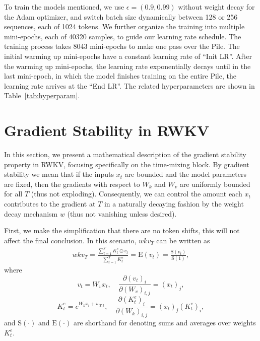 \documentclass[11pt]{article}
\begin{document}
To train the models mentioned, we use $\epsilon=(0.9,0.99)$ without weight decay for the Adam optimizer, and switch batch size dynamically between 128 or 256 sequences, each of 1024 tokens.
We further organize the training into multiple mini-epochs, each of 40320 samples, to guide our learning rate schedule.
The training process takes 8043 mini-epochs to make one pass over the Pile.
The initial warming up mini-epochs have a constant learning rate of ``Init LR''.
After the warming up mini-epochs, the learning rate exponentially decays until in the last mini-epoch, in which the model finishes training on the entire Pile, the learning rate arrives at the ``End LR''.
The related hyperparameters are shown in Table~\ref{tab:hyperparam}.

\section{Gradient Stability in RWKV} 
\label{sec:appendix-gradstab}

In this section, we present a mathematical description of the gradient stability property in RWKV, focusing specifically on the time-mixing block. By gradient stability we mean that if the inputs $x_t$ are bounded and the model parameters are fixed, then the gradients with respect to $W_k$ and $W_v$ are uniformly bounded for all $T$ (thus not exploding). Consequently, we can control the amount each $x_t$ contributes to the gradient at $T$ in a naturally decaying fashion by the weight decay mechanism $w$ (thus not vanishing unless desired).

First, we make the simplification that there are no token shifts, this will not affect the final conclusion. In this scenario, $wkv_T$ can be written as
\begin{align} wkv_T = \frac{\sum _{t=1}^T K^e_t \odot v_t} {\sum _{t=1}^T K^e_t} = \mathrm{E} (v_t) = \frac{\mathrm{S}(v_t)}{\mathrm{S}(1)},
\end{align}
where
$$ v_t = W_v x_t, \quad\frac{\partial (v_t)_i}{\partial(W_v)_{i,j}} = (x_t)_j, $$
$$ K^e_t = e^{W_k x_t+w_{T,t}}, \quad\frac{\partial (K^e_t)_i}{\partial (W_k)_{i,j}} = (x_t)_j (K^e_t)_i, $$
and $\mathrm{S}(\cdot)$ and $\mathrm{E}(\cdot)$ are shorthand for denoting sums and averages over weights $K^e_t$.
\end{document}
